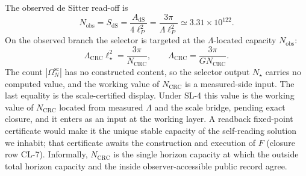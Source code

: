 The observed de Sitter read-off is
\[
N_{\mathrm{obs}}
=S_{\mathrm{dS}}
=\frac{A_{\mathrm{dS}}}{4\ell_P^2}
=\frac{3\pi}{\Lambda\ell_P^2}
\simeq3.31\times10^{122}.
\]
On the observed branch the selector is targeted at the \(\Lambda\)-located capacity \(N_{\mathrm{obs}}\):
\[
\Lambda_{\mathrm{CRC}}\ell_\star^2=\frac{3\pi}{N_{\mathrm{CRC}}},
\qquad
\Lambda_{\mathrm{CRC}}=\frac{3\pi}{G N_{\mathrm{CRC}}}.
\]
The count \(|\Omega^{\mathrm{sc}}_N|\) has no constructed content, so the selector output
\(N_\star\) carries no computed value, and the working value of \(N_{\mathrm{CRC}}\) is a
measured-side input. The last equality is the scale-certified display. Under SL-4 this value is the working value of
\(N_{\mathrm{CRC}}\) located from measured \(\Lambda\) and the scale bridge, pending exact
closure, and it enters as an input at the working layer.
A readback fixed-point certificate would make it the unique stable capacity of the self-reading
solution we inhabit; that certificate awaits the construction and execution of \(F\) (closure row
CL-7). Informally, \(N_{\mathrm{CRC}}\)
is the single horizon capacity at which the outside total horizon capacity and the inside
observer-accessible public record agree.

